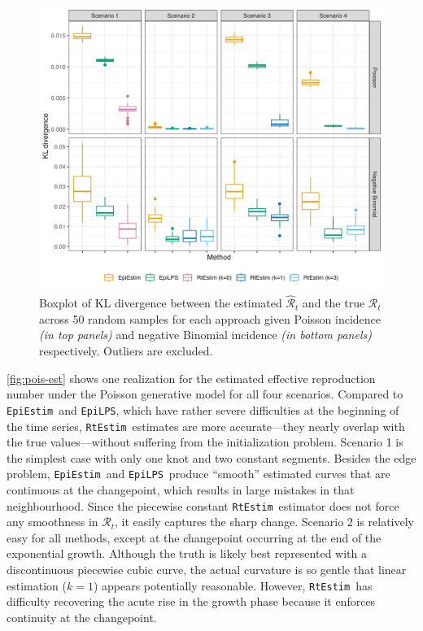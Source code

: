 \documentclass[10pt,letterpaper]{article}
\def\RtEstim{\texttt{RtEstim}}
\def\EpiEstim{\texttt{EpiEstim}}
\def\EpiLPS{\texttt{EpiLPS}}
\def\calR{\mathcal{R}}
\begin{document}
\begin{figure}[!ht]
  \centering
  \includegraphics[width=.99\textwidth]{fig/KL_no_outlier.png}
  \caption{Boxplot of KL divergence between the estimated 
  $\hat{\calR}_t$ and the true $\calR_t$ across 50 random samples for 
  each approach given Poisson incidence \textit{(in top panels)} and negative 
  Binomial incidence \textit{(in bottom panels)} respectively.  
  Outliers are excluded.} 
  \label{fig:kl-res}
\end{figure}

\autoref{fig:pois-est} shows one realization for the estimated effective reproduction
number under the Poisson generative model for all four scenarios. Compared to
\EpiEstim\ and \EpiLPS, which have rather severe difficulties at the beginning
of the time series, \RtEstim\ estimates are more accurate---they nearly
overlap with the true values---without suffering from the initialization
problem. Scenario
1 is the simplest case with only one knot and two constant segments. Besides the
edge problem, \EpiEstim\ and \EpiLPS\ produce ``smooth'' estimated curves that
are continuous at the changepoint, which results in large mistakes in that
neighbourhood. Since the piecewise constant \RtEstim\ estimator does not force
any smoothness in $\calR_t$, it easily captures the sharp change. 
Scenario 2 is relatively easy for all methods, except at the changepoint 
occurring at the end of the exponential growth. Although the truth is
likely best represented with a discontinuous piecewise cubic curve, the actual
curvature is so gentle that linear estimation ($k=1$) appears potentially
reasonable. However,
\RtEstim\ has difficulty recovering the acute rise in the
growth phase because it enforces continuity at the changepoint. 
\end{document}
